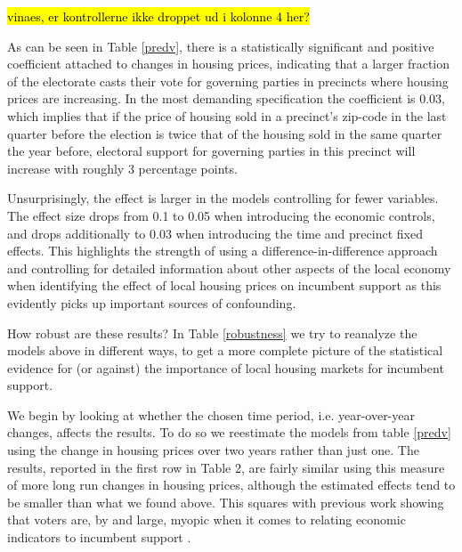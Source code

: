 \documentclass[12pt,a4paper]{article}
\begin{document}
	\hl{vinaes, er kontrollerne ikke droppet ud i kolonne 4 her?}
	
	
	
	As can be seen in Table \ref{predv}, there is a statistically significant and positive coefficient attached to changes in housing prices, indicating that a larger fraction of the electorate casts their vote for governing parties in precincts where housing prices are increasing. In the most demanding specification the coefficient is 0.03,  which implies that if the price of housing sold in a precinct's zip-code in the last quarter before the election is twice that of the housing sold in the same quarter the year before, electoral support for  governing parties in this precinct will increase with roughly 3 percentage points.
	
	Unsurprisingly, the effect is larger in the models controlling for fewer variables. The effect size drops from 0.1 to 0.05 when introducing the economic controls, and drops additionally to 0.03 when introducing the time and precinct fixed effects. This highlights the strength of using a difference-in-difference approach and controlling for detailed information about other aspects of the local economy when identifying the effect of local housing prices on incumbent support as this evidently picks up important sources of confounding.

	How robust are these results? In Table \ref{robustness} we try to reanalyze the models above in different ways, to get a more complete picture of the statistical evidence for (or against) the importance of local housing markets for incumbent support.
	
	
	
	
	We begin by looking at whether the chosen time period, i.e. year-over-year changes, affects the results. To do so we reestimate the models from table \ref{predv} using the change in housing prices over two years rather than just one. The results, reported in the first row in Table 2, are fairly similar using this measure of more long run changes in housing prices, although the estimated effects tend to be smaller than what we found above. This squares with previous work showing that voters are, by and large, myopic when it comes to relating economic indicators to incumbent support \citep{healy2009myopic,healy2014substituting}.
	
\end{document}
